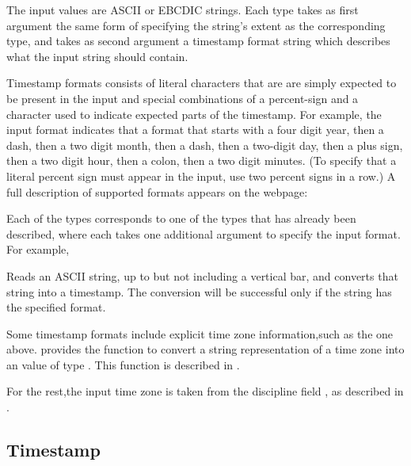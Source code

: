 The input values are ASCII or EBCDIC strings.  Each
 type takes as first argument the same form of
specifying the string's extent as the corresponding  type, and
takes as second argument a timestamp format string which describes
what the input string should contain.

Timestamp formats consists of literal characters that are are simply
expected to be present in the input and special combinations of a
percent-sign and a character used to indicate expected parts of the
timestamp.  For example, the input format
indicates that a format that starts with a 
four digit year, then a dash, then a two digit month, then a dash,
then a two-digit day, then a plus sign, then a two digit hour, then a
colon, then a two digit minutes.  (To specify that a literal percent
sign must appear in the input, use two percent signs in a row.)  A
full description of supported formats appears on the webpage:


Each of the  types corresponds to one of the 
types that has already been described, where each takes one additional argument
to specify the input format.  For example,

%
\noindent
Reads an ASCII string, up to but not including a vertical bar, and
converts that string into a  timestamp.  The conversion will be
successful only if the string has the specified format.

Some timestamp formats include explicit time zone information,such as
the one above.  \pads{} provides the function  to convert a
string representation of a time zone into an value of type
.  This function is described in .

For the rest,the input time zone is taken
from the \pads{} discipline field , as
described in .

\subsection{Timestamp}

\aedBegin{}
\aedEnd{}

